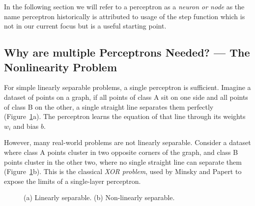 \documentclass[12pt, a4paper]{article}
\begin{document}
In the following section we will refer to a perceptron as a \emph{neuron or node} as the name perceptron historically is attributed to usage of the step function which is not in our current focus but is a useful starting point. 

\subsection{Why are multiple Perceptrons Needed? — The Nonlinearity Problem}
\label{sec:nonlinearity}

For simple linearly separable problems, a single perceptron  is sufficient. Imagine a dataset of points on a graph, if
all points of class A sit on one side and all points of class B on the other, a single straight line separates them perfectly (Figure~\ref{fig:xor_problem}a). The perceptron
learns the equation of that line through its weights $w_i$ and bias $b$.

However, many real-world problems are not linearly separable. Consider a dataset where
class A points cluster in two opposite corners of the graph, and class B points cluster
in the other two, where no single straight line can separate them
(Figure~\ref{fig:xor_problem}b). This is the classical \emph{XOR problem}, used by
Minsky and Papert \citep{minsky1969} to expose the limits of a single-layer perceptron.
\begin{figure}[H]
\centering
{}
\hspace{0.6cm}
\caption{(a) Linearly separable.  (b) Non-linearly separable.}
\label{fig:xor_problem}
\end{figure}
\end{document}

